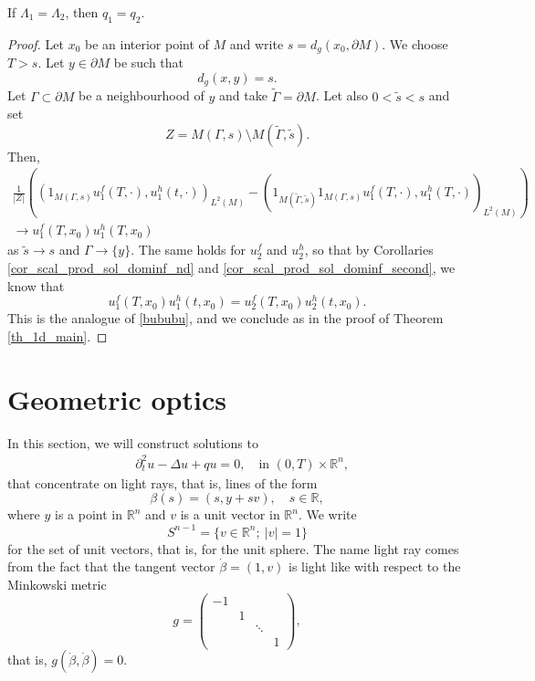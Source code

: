\documentclass[12pt,oneside,final]{amsart}
\def\p{\partial}
\def\R{\mathbb R}
\begin{document}
\begin{theorem}
	If $\Lambda_1 = \Lambda_2$, then $q_1 = q_2$.
\end{theorem}

\begin{proof}
	Let $x_0$ be an interior point of $M$ and write $s=d_g(x_0,\partial M)$. We choose $T>s$. Let $y\in \partial M$ be such that
	\begin{equation*}
		d_g(x,y) = s.
	\end{equation*}
	Let $\Gamma \subset \p M$ be a neighbourhood of $y$ and take  $\tilde \Gamma = \partial M$.
 Let also $0 < \tilde{s} < s $ and set
	\begin{equation*}
		Z = M(\Gamma,s) \setminus M(\tilde{\Gamma},\tilde{s}).
	\end{equation*}
	Then, 
	\begin{multline*}
		\frac{1}{|Z|} \left(\left(  1_{M(\Gamma,s)}  u_1^f(T,\cdot), u_1^h(t,\cdot)  \right)_{L^2(M)}  - \left(  1_{M(\tilde{\Gamma},\tilde{s})} 1_{M(\Gamma,s)} u_1^f(T,\cdot),  u_1^h(T,\cdot)  \right)_{L^2(M)} \right)\\
		\rightarrow u_1^f(T,x_0)u_1^h(T,x_0)
	\end{multline*}
	as $\tilde{s} \rightarrow s$ and $\Gamma \to \{y\}$. The same holds for $u_2^f$ and $u_2^h$, so that by Corollaries \ref{cor_scal_prod_sol_dominf_nd} and \ref{cor_scal_prod_sol_dominf_second}, we know that 
	\begin{equation*}%
		u_1^f(T,x_0)u_1^h(t,x_0) = u_2^f(T,x_0)u_2^h(t,x_0).
	\end{equation*}
This is the analogue of \eqref{bububu}, and we conclude as in the proof of Theorem \ref{th_1d_main}.
\end{proof}


\section{Geometric optics}\label{sec_go}

In this section, we will construct solutions to 
\begin{align}\label{eq_wave_Min}
&\p_t^2 u - \Delta u + q u = 0, \quad \text{in $(0,T) \times \R^n$},
\end{align}
that concentrate on light rays, that is, lines of the form 
$$
\beta(s) = (s, y + s v), \quad s \in \R,
$$
where $y$ is a point in $\R^n$ and $v$ is a unit vector in $\R^n$.
We write $$S^{n-1} = \{v \in \R^n;\ |v|=1\}$$
for the set of unit vectors, that is, for the unit sphere. 
The name light ray comes from the fact that the tangent vector $\dot \beta = (1, v)$ is light like with respect to the Minkowski metric
\begin{equation}\label{minkowski_g}
g = \begin{pmatrix}
-1 \\
& 1 \\
&& \ddots \\
&&& 1 
\end{pmatrix},
\end{equation}
that is, $g(\dot \beta, \dot \beta) = 0$.
\end{document}
